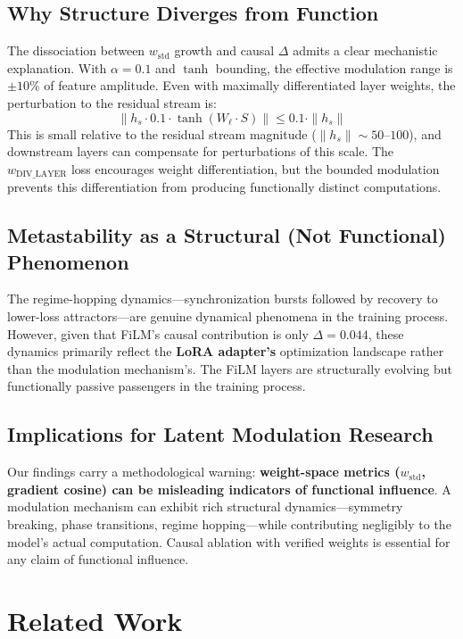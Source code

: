 \documentclass[11pt,a4paper]{article}
\begin{document}
\subsection{Why Structure Diverges from Function}

The dissociation between $w_{\mathrm{std}}$ growth and causal $\Delta$ admits a
clear mechanistic explanation. With $\alpha = 0.1$ and $\tanh$ bounding, the
effective modulation range is $\pm 10\%$ of feature amplitude. Even with maximally
differentiated layer weights, the perturbation to the residual stream is:
$$\|h_s \cdot 0.1 \cdot \tanh(W_\ell \cdot S)\| \leq 0.1 \cdot \|h_s\|$$
This is small relative to the residual stream magnitude ($\|h_s\| \sim 50$--$100$),
and downstream layers can compensate for perturbations of this scale. The
$w_{\mathrm{DIV\_LAYER}}$ loss encourages weight differentiation, but the bounded
modulation prevents this differentiation from producing functionally distinct
computations.

\subsection{Metastability as a Structural (Not Functional) Phenomenon}

The regime-hopping dynamics---synchronization bursts followed by recovery to
lower-loss attractors---are genuine dynamical phenomena in the training process.
However, given that FiLM's causal contribution is only $\Delta = 0.044$, these
dynamics primarily reflect the \textbf{LoRA adapter's} optimization landscape rather
than the modulation mechanism's. The FiLM layers are structurally evolving but
functionally passive passengers in the training process.

\subsection{Implications for Latent Modulation Research}

Our findings carry a methodological warning: \textbf{weight-space metrics
($w_{\mathrm{std}}$, gradient cosine) can be misleading indicators of functional
influence}. A modulation mechanism can exhibit rich structural dynamics---symmetry
breaking, phase transitions, regime hopping---while contributing negligibly to the
model's actual computation. Causal ablation with verified weights is essential for
any claim of functional influence.

\section{Related Work}
\end{document}
